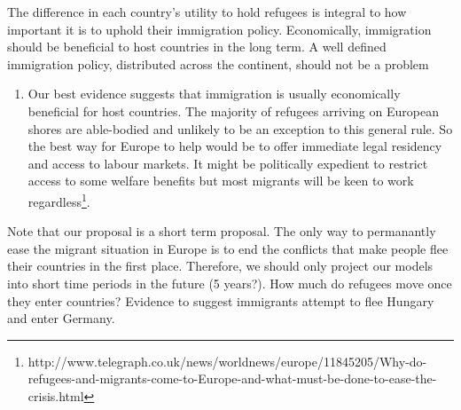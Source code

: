 \documentclass{article}
\begin{document}
The difference in each country's utility to hold refugees is integral to how important it is to uphold their immigration policy. Economically, immigration should be beneficial to host countries in the long term. A well defined immigration policy, distributed across the continent, should not be a problem

\begin{enumerate}
    \item Our best evidence suggests that immigration is usually economically beneficial for host countries. The majority of refugees arriving on European shores are able-bodied and unlikely to be an exception to this general rule. So the best way for Europe to help would be to offer immediate legal residency and access to labour markets. It might be politically expedient to restrict access to some welfare benefits but most migrants will be keen to work regardless\footnote{http://www.telegraph.co.uk/news/worldnews/europe/11845205/Why-do-refugees-and-migrants-come-to-Europe-and-what-must-be-done-to-ease-the-crisis.html}.
\end{enumerate}

Note that our proposal is a short term proposal. The only way to permanantly ease the migrant situation in Europe is to end the conflicts that make people flee their countries in the first place. Therefore, we should only project our models into short time periods in the future (5 years?). How much do refugees move once they enter countries? Evidence to suggest immigrants attempt to flee Hungary and enter Germany.
\end{document}

